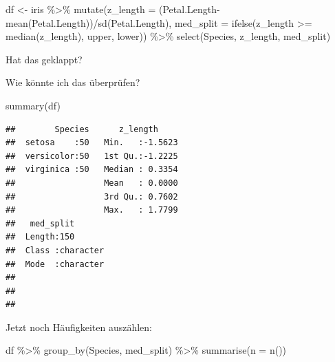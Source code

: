 \documentclass[
]{book}
\newenvironment{Shaded}{\begin{snugshade}}{\end{snugshade}}
\newcommand{\AttributeTok}[1]{\textcolor[rgb]{0.77,0.63,0.00}{#1}}
\newcommand{\FunctionTok}[1]{\textcolor[rgb]{0.00,0.00,0.00}{#1}}
\newcommand{\NormalTok}[1]{#1}
\newcommand{\OtherTok}[1]{\textcolor[rgb]{0.56,0.35,0.01}{#1}}
\newcommand{\SpecialCharTok}[1]{\textcolor[rgb]{0.00,0.00,0.00}{#1}}
\newcommand{\StringTok}[1]{\textcolor[rgb]{0.31,0.60,0.02}{#1}}
\begin{document}
\begin{Shaded}
\begin{Highlighting}[]
\NormalTok{df }\OtherTok{\textless{}{-}}\NormalTok{ iris }\SpecialCharTok{\%\textgreater{}\%} 
  \FunctionTok{mutate}\NormalTok{(}\AttributeTok{z\_length =}\NormalTok{ (Petal.Length}\SpecialCharTok{{-}}\FunctionTok{mean}\NormalTok{(Petal.Length))}\SpecialCharTok{/}\FunctionTok{sd}\NormalTok{(Petal.Length),}
        \AttributeTok{med\_split =} \FunctionTok{ifelse}\NormalTok{(z\_length }\SpecialCharTok{\textgreater{}=} \FunctionTok{median}\NormalTok{(z\_length),}
                            \StringTok{\textquotesingle{}upper\textquotesingle{}}\NormalTok{,}
                            \StringTok{\textquotesingle{}lower\textquotesingle{}}\NormalTok{)) }\SpecialCharTok{\%\textgreater{}\%} 
  \FunctionTok{select}\NormalTok{(Species, z\_length, med\_split) }
\end{Highlighting}
\end{Shaded}

Hat das geklappt?

Wie könnte ich das überprüfen?

\begin{Shaded}
\begin{Highlighting}[]
\FunctionTok{summary}\NormalTok{(df)}
\end{Highlighting}
\end{Shaded}

\begin{verbatim}
##        Species      z_length      
##  setosa    :50   Min.   :-1.5623  
##  versicolor:50   1st Qu.:-1.2225  
##  virginica :50   Median : 0.3354  
##                  Mean   : 0.0000  
##                  3rd Qu.: 0.7602  
##                  Max.   : 1.7799  
##   med_split        
##  Length:150        
##  Class :character  
##  Mode  :character  
##                    
##                    
## 
\end{verbatim}

Jetzt noch Häufigkeiten auszählen:

\begin{Shaded}
\begin{Highlighting}[]
\NormalTok{df }\SpecialCharTok{\%\textgreater{}\%} 
  \FunctionTok{group\_by}\NormalTok{(Species, med\_split) }\SpecialCharTok{\%\textgreater{}\%} 
  \FunctionTok{summarise}\NormalTok{(}\AttributeTok{n =} \FunctionTok{n}\NormalTok{())}
\end{Highlighting}
\end{Shaded}
\end{document}
